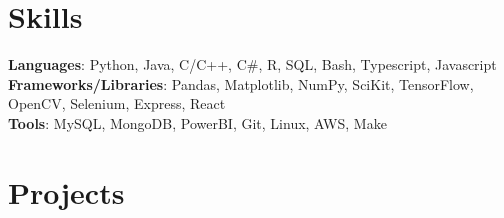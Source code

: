 \documentclass[letterpaper,11pt]{article}
\newcommand{\resumeSubHeadingListStart}{\begin{itemize}[leftmargin=0.15in, label={}]}
\newcommand{\resumeSubHeadingListEnd}{\end{itemize}}
\begin{document}


\section{Skills}
 \begin{itemize}[leftmargin=0.15in, label={}]
    \small{\item{
     \textbf{Languages}{: Python, Java, C/C++, C\#, R, SQL, Bash, Typescript, Javascript} \\
     \textbf{Frameworks/Libraries}{: Pandas, Matplotlib, NumPy, SciKit, TensorFlow, OpenCV, Selenium, Express, React} \\
     \textbf{Tools}{: MySQL, MongoDB, PowerBI, Git, Linux, AWS, Make} \\
    }}
 \end{itemize}





\section{Projects}
  \resumeSubHeadingListStart

  
  
    
  
  
  
  
  
  
  \resumeSubHeadingListEnd
  
% 







\end{document}
